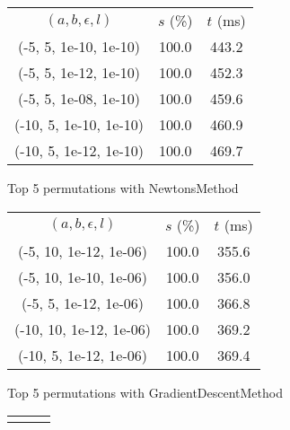 \begin{figure}[H]
\label{fig:param_comp_MatrixSquareSum_FibonacciSearch}
\begin{subfigure}[ht]{.5\textwidth}
\begin{tabular}{|c|c|c|}
\hline
\rowcolor{gray!25}
\multicolumn{3}{|c|}{NewtonsMethod} \\
\hline
\rowcolor{gray!25}
$(a,b,\epsilon,l)$ & $s$ (\%) & $t$ (ms) \\
\hline
(-5, 5, 1e-10, 1e-10) & 100.0 & 443.2 \\
(-5, 5, 1e-12, 1e-10) & 100.0 & 452.3 \\
(-5, 5, 1e-08, 1e-10) & 100.0 & 459.6 \\
(-10, 5, 1e-10, 1e-10) & 100.0 & 460.9 \\
(-10, 5, 1e-12, 1e-10) & 100.0 & 469.7 \\
\hline
\end{tabular}
\caption{Top 5 permutations with NewtonsMethod}
\label{subfig:param_comp_MatrixSquareSum_NewtonsMethod_FibonacciSearch}
\end{subfigure}
\hfill
\begin{subfigure}[ht]{.5\textwidth}
\begin{tabular}{|c|c|c|}
\hline
\rowcolor{gray!25}
\multicolumn{3}{|c|}{GradientDescentMethod} \\
\hline
\rowcolor{gray!25}
$(a,b,\epsilon,l)$ & $s$ (\%) & $t$ (ms) \\
\hline
(-5, 10, 1e-12, 1e-06) & 100.0 & 355.6 \\
(-5, 10, 1e-10, 1e-06) & 100.0 & 356.0 \\
(-5, 5, 1e-12, 1e-06) & 100.0 & 366.8 \\
(-10, 10, 1e-12, 1e-06) & 100.0 & 369.2 \\
(-10, 5, 1e-12, 1e-06) & 100.0 & 369.4 \\
\hline
\end{tabular}
\caption{Top 5 permutations with GradientDescentMethod}
\label{subfig:param_comp_MatrixSquareSum_GradientDescentMethod_FibonacciSearch}
\end{subfigure}
\hfill
\begin{subfigure}[ht]{.5\textwidth}
\begin{tabular}{|c|c|c|}
\hline
\rowcolor{gray!25}
\multicolumn{3}{|c|}{ConjugateGradientMethod} \\

\end{tabular}
\end{subfigure}
\end{figure}
